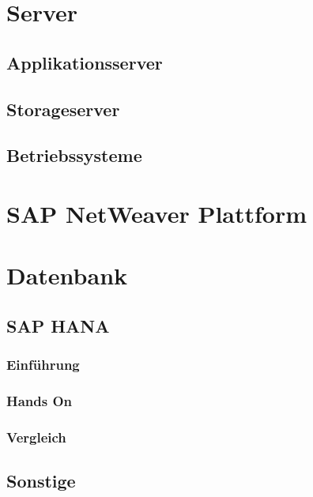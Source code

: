 \section{Server}

\subsection{Applikationsserver}
\label{sec:app-server}

\subsection{Storageserver}
\label{sec:stor-server}

\subsection{Betriebssysteme}
\label{sec:server-os}

\section{SAP NetWeaver Plattform}
\label{sec:netweaver}

\section{Datenbank}

\subsection{SAP HANA}
\label{sec:db-hana}

\subsubsection{Einführung}
\label{sec:db-hana-intro}

\subsubsection{Hands On}
\label{sec:db-hana-ho}

\subsubsection{Vergleich}
\label{sec:db-hana-vgl}

\subsection{Sonstige}
\label{sec:db-sonstige}
